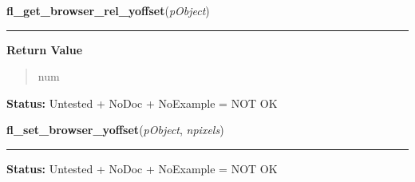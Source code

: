     \label{xformslib:library:fl_get_browser_rel_yoffset}

    \vspace{0.5ex}

\hspace{.8\funcindent}\begin{boxedminipage}{\funcwidth}

    \raggedright \textbf{fl\_get\_browser\_rel\_yoffset}(\textit{pObject})

    \vspace{-1.5ex}

    \rule{\textwidth}{0.5\fboxrule}
\setlength{\parskip}{2ex}
\setlength{\parskip}{1ex}
      \textbf{Return Value}
    \vspace{-1ex}

      \begin{quote}
      num

      \end{quote}

\textbf{Status:} Untested + NoDoc + NoExample = NOT OK



    \end{boxedminipage}

    \label{xformslib:library:fl_set_browser_yoffset}

    \vspace{0.5ex}

\hspace{.8\funcindent}\begin{boxedminipage}{\funcwidth}

    \raggedright \textbf{fl\_set\_browser\_yoffset}(\textit{pObject}, \textit{npixels})

    \vspace{-1.5ex}

    \rule{\textwidth}{0.5\fboxrule}
\setlength{\parskip}{2ex}
\setlength{\parskip}{1ex}
\textbf{Status:} Untested + NoDoc + NoExample = NOT OK



    \end{boxedminipage}

    \label{xformslib:library:fl_set_browser_rel_yoffset}

